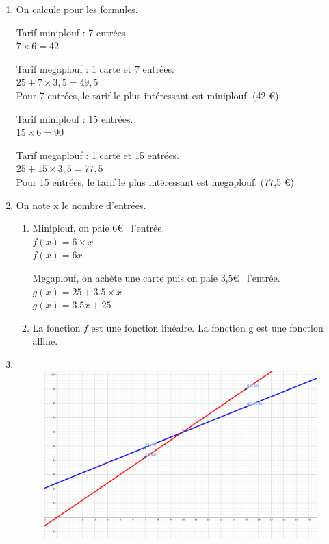 \documentclass[11pt]{article}
\begin{document}
\begin{enumerate}
    \item[1.] On calcule pour les formules. 
    \begin{multicols}{2}
    Tarif miniplouf : 7 entrées. \\
    $7 \times 6 = 42 $

    Tarif megaplouf : 1 carte et 7 entrées. \\
    $25 + 7 \times 3,5 = 49,5$ \\
    Pour 7 entrées, le tarif le plus intéressant est miniplouf. (42 \euro) \columnbreak

    Tarif miniplouf : 15 entrées. \\
    $15 \times 6 = 90 $

    Tarif megaplouf : 1 carte et 15 entrées. \\
    $25 + 15 \times 3,5 = 77,5$\\
    Pour 15 entrées, le tarif le plus intéressant est megaplouf. (77,5 \euro) 
    \end{multicols}
    \item[2.] On note x le nombre d'entrées.
     \begin{enumerate}
        \item[2a.]
        \begin{minipage}[t]{0.4\textwidth}
        Miniplouf, on paie 6\euro~ l'entrée. \\
        $f(x) = 6 \times x$ \\
        $f(x) = 6x$ \\
        \end{minipage}
        \begin{minipage}[t]{0.6\textwidth}        
        Megaplouf, on achète une carte puis on paie 3,5\euro~ l'entrée. \\
        $g(x) = 25  + 3.5 \times x$ \\
        $g(x) = 3.5x + 25$
\end{minipage}
        \item[2b.] La fonction $f$ est une fonction linéaire. La fonction g est une fonction affine.
    \end{enumerate}
    \item[3.]
    \begin{figure}[H]
        \centering
        \includegraphics[width=0.9\linewidth]{_continuite/sources/s1-p133ex79.png}

\end{figure}
\end{enumerate}
\end{document}
